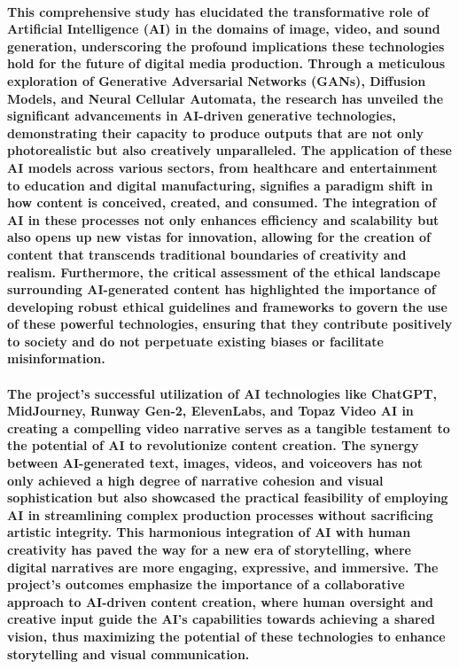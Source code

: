 \documentclass[11pt,a4paper,oneside]{report}
\begin{document}
\paragraph{This comprehensive study has elucidated the transformative role of Artificial Intelligence (AI) in the domains of image, video, and sound generation, underscoring the profound implications these technologies hold for the future of digital media production. Through a meticulous exploration of Generative Adversarial Networks (GANs), Diffusion Models, and Neural Cellular Automata, the research has unveiled the significant advancements in AI-driven generative technologies, demonstrating their capacity to produce outputs that are not only photorealistic but also creatively unparalleled. The application of these AI models across various sectors, from healthcare and entertainment to education and digital manufacturing, signifies a paradigm shift in how content is conceived, created, and consumed. The integration of AI in these processes not only enhances efficiency and scalability but also opens up new vistas for innovation, allowing for the creation of content that transcends traditional boundaries of creativity and realism. Furthermore, the critical assessment of the ethical landscape surrounding AI-generated content has highlighted the importance of developing robust ethical guidelines and frameworks to govern the use of these powerful technologies, ensuring that they contribute positively to society and do not perpetuate existing biases or facilitate misinformation.}

\paragraph{The project's successful utilization of AI technologies like ChatGPT, MidJourney, Runway Gen-2, ElevenLabs, and Topaz Video AI in creating a compelling video narrative serves as a tangible testament to the potential of AI to revolutionize content creation. The synergy between AI-generated text, images, videos, and voiceovers has not only achieved a high degree of narrative cohesion and visual sophistication but also showcased the practical feasibility of employing AI in streamlining complex production processes without sacrificing artistic integrity. This harmonious integration of AI with human creativity has paved the way for a new era of storytelling, where digital narratives are more engaging, expressive, and immersive. The project's outcomes emphasize the importance of a collaborative approach to AI-driven content creation, where human oversight and creative input guide the AI's capabilities towards achieving a shared vision, thus maximizing the potential of these technologies to enhance storytelling and visual communication.}
\end{document}
